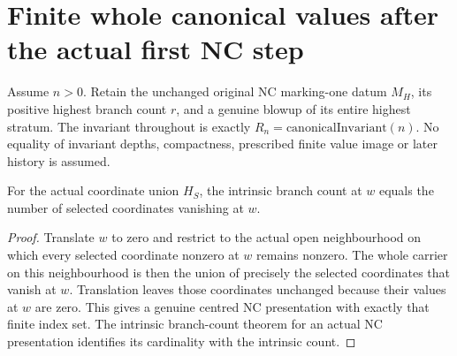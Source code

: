 \section{Finite whole canonical values after the actual first NC step}
\label{sec:hironaka-normal-crossings-first-step-finite-values}

Assume $n>0$. Retain the unchanged original NC marking-one datum $M_H$,
its positive highest branch count $r$, and a genuine blowup of its entire
highest stratum. The invariant throughout is exactly
$R_n=\mathrm{canonicalInvariant}(n)$. No equality of invariant depths,
compactness, prescribed finite value image or later history is assumed.

\begin{lemma}
\label{hir:general-nc-coordinate-carrier-intrinsic-count}
\leanok
{}
For the actual coordinate union $H_S$, the intrinsic branch count at $w$
equals the number of selected coordinates vanishing at $w$.
\end{lemma}
\begin{proof}
Translate $w$ to zero and restrict to the actual open neighbourhood on
which every selected coordinate nonzero at $w$ remains nonzero. The whole
carrier on this neighbourhood is then the union of precisely the selected
coordinates that vanish at $w$. Translation leaves those coordinates
unchanged because their values at $w$ are zero. This gives a genuine
centred NC presentation with exactly that finite index set. The intrinsic
branch-count theorem for an actual NC presentation identifies its
cardinality with the intrinsic count.
\end{proof}



